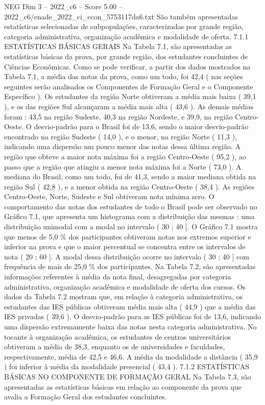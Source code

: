 \begin{textsample}{NEG Dim 3 – 2022\_c6 – Score 5.00 – 2022\_c6/enade\_2022\_ci\_econ\_5753117da6.txt}
São também apresentadas estatísticas selecionadas de subpopulações, caracterizadas por grande região, categoria administrativa, organização acadêmica e modalidade de oferta. 7.1.1 ESTATÍSTICAS BÁSICAS GERAIS Na Tabela 7.1, são apresentadas as estatísticas básicas da prova, por grande região, dos estudantes concluintes de Ciências Econômicas.
Como se pode verificar, a partir dos dados mostrados na Tabela 7.1, a média das notas da prova, como um todo, foi 42,4 ( nas seções seguintes serão analisados os Componentes de Formação Geral e o Componente Específico ).
Os estudantes da região Norte obtiveram a média mais baixa ( 39,1 ), e os das regiões Sul alcançaram a média mais alta ( 43,6 ).
As demais médias foram : 43,5 na região Sudeste, 40,3 na região Nordeste, e 39,9, na região Centro-Oeste.
O desvio-padrão para o Brasil foi de 13,6, sendo o maior desvio-padrão encontrado na região Sudeste ( 14,0 ), e o menor, na região Norte ( 11,3 ), indicando uma dispersão um pouco menor das notas dessa última região.
A região que obteve a maior nota máxima foi a região Centro-Oeste ( 95,2 ), ao passo que a região que atingiu a menor nota máxima foi a Norte ( 73,0 ).
A mediana do Brasil, como um todo, foi de 41,3, sendo a maior mediana obtida na região Sul ( 42,8 ), e a menor obtida na região Centro-Oeste ( 38,4 ).
As regiões Centro-Oeste, Norte, Sudeste e Sul obtiveram nota mínima zero.
O comportamento das notas dos estudantes de todo o Brasil pode ser observado no Gráfico 7.1, que apresenta um histograma com a distribuição das mesmas : uma distribuição unimodal com a modal no intervalo ( 30 ; 40 ].
O Gráfico 7.1 mostra que menos de 5,0 \% dos participantes obtiveram notas nos extremos superior e inferior na prova e que o maior percentual se concentra entre os intervalos de nota ( 20 ; 60 ].
A modal dessa distribuição ocorre no intervalo ( 30 ; 40 ] com frequência de mais de 25,0 \% dos participantes.
Na Tabela 7.2, são apresentadas informações referentes à média da nota final, desagregadas por categoria administrativa, organização acadêmica e modalidade de oferta dos cursos.
Os dados da Tabela 7.2 mostram que, em relação à categoria administrativa, os estudantes das IES públicas obtiveram média mais alta ( 44,9 ) que a média das IES privadas ( 39,6 ).
O desvio-padrão para as IES públicas foi de 13,6, indicando uma dispersão extremamente baixa das notas nesta categoria administrativa.
No tocante à organização acadêmica, os estudantes de centros universitários obtiveram a média de 38,3, enquanto os de universidades e faculdades, respectivamente, média de 42,5 e 46,6.
A média da modalidade a distância ( 35,9 ) foi inferior à média da modalidade presencial ( 43,4 ). 7.1.2 ESTATÍSTICAS BÁSICAS NO COMPONENTE DE FORMAÇÃO GERAL Na Tabela 7.3, são apresentadas as estatísticas básicas em relação ao componente da prova que avalia a Formação Geral dos estudantes concluintes.

\end{textsample}
